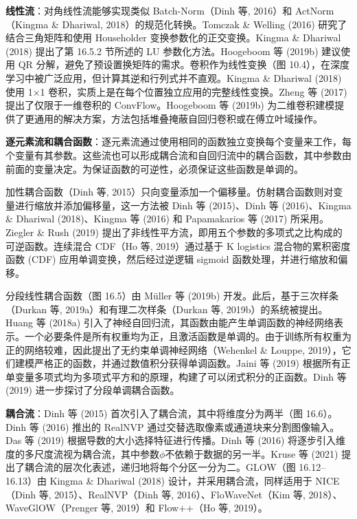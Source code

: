 \documentclass[lang=cn,newtx,10pt,scheme=chinese]{elegantbook}
\begin{document}
\textbf{线性流}：对角线性流能够实现类似 Batch-Norm（Dinh 等, 2016）和 ActNorm（Kingma \& Dhariwal, 2018）的规范化转换。Tomczak \& Welling (2016) 研究了结合三角矩阵和使用 Householder 变换参数化的正交变换。Kingma \& Dhariwal (2018) 提出了第 16.5.2 节所述的 LU 参数化方法。Hoogeboom 等 (2019b) 建议使用 QR 分解，避免了预设置换矩阵的需求。卷积作为线性变换（图 10.4），在深度学习中被广泛应用，但计算其逆和行列式并不直观。Kingma \& Dhariwal (2018) 使用 1×1 卷积，实质上是在每个位置独立应用的完整线性变换。Zheng 等 (2017) 提出了仅限于一维卷积的 ConvFlow。Hoogeboom 等 (2019b) 为二维卷积建模提供了更通用的解决方案，方法包括堆叠掩蔽自回归卷积或在傅立叶域操作。

\textbf{逐元素流和耦合函数}：逐元素流通过使用相同的函数独立变换每个变量来工作，每个变量有其参数。这些流也可以形成耦合流和自回归流中的耦合函数，其中参数由前面的变量决定。为保证函数的可逆性，必须保证这些函数是单调的。

加性耦合函数（Dinh 等, 2015）只向变量添加一个偏移量。仿射耦合函数则对变量进行缩放并添加偏移量，这一方法被 Dinh 等 (2015)、Dinh 等 (2016)、Kingma \& Dhariwal (2018)、Kingma 等 (2016) 和 Papamakarios 等 (2017) 所采用。Ziegler \& Rush (2019) 提出了非线性平方流，即用五个参数的多项式之比构成的可逆函数。连续混合 CDF（Ho 等, 2019）通过基于 K logistics 混合物的累积密度函数 (CDF) 应用单调变换，然后经过逆逻辑 sigmoid 函数处理，并进行缩放和偏移。

分段线性耦合函数（图 16.5）由 Müller 等 (2019b) 开发。此后，基于三次样条（Durkan 等, 2019a）和有理二次样条（Durkan 等, 2019b）的系统被提出。Huang 等 (2018a) 引入了神经自回归流，其函数由能产生单调函数的神经网络表示。一个必要条件是所有权重均为正，且激活函数是单调的。由于训练所有权重为正的网络较难，因此提出了无约束单调神经网络（Wehenkel \& Louppe, 2019），它们建模严格正的函数，并通过数值积分获得单调函数。Jaini 等 (2019) 根据所有正单变量多项式均为多项式平方和的原理，构建了可以闭式积分的正函数。Dinh 等 (2019) 进一步探讨了分段单调耦合函数。

\textbf{耦合流}：Dinh 等 (2015) 首次引入了耦合流，其中将维度分为两半（图 16.6）。Dinh 等 (2016) 推出的 RealNVP 通过交替选取像素或通道块来分割图像输入。Das 等 (2019) 根据导数的大小选择特征进行传播。Dinh 等 (2016) 将逐步引入维度的多尺度流视为耦合流，其中参数\(\phi\)不依赖于数据的另一半。Kruse 等 (2021) 提出了耦合流的层次化表述，递归地将每个分区一分为二。GLOW（图 16.12–16.13）由 Kingma \& Dhariwal (2018) 设计，并采用耦合流，同样适用于 NICE（Dinh 等, 2015）、RealNVP（Dinh 等, 2016）、FloWaveNet（Kim 等, 2018）、WaveGlOW（Prenger 等, 2019）和 Flow++（Ho 等, 2019）。
\end{document}
